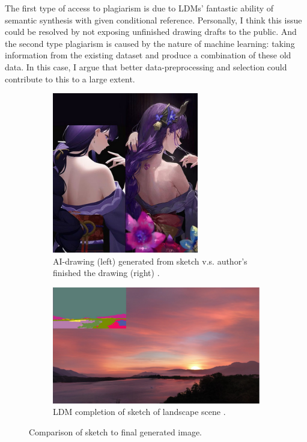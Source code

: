The first type of access to plagiarism is due to LDMs' fantastic ability of semantic 
synthesis with given conditional reference.
Personally, I think this issue could be resolved by not exposing unfinished drawing drafts to the public.
And the second type plagiarism is caused by the nature of machine learning:
taking information from the existing dataset and produce a combination of these old data.
In this case, I argue that better data-preprocessing and selection could contribute to this to a large extent.
\begin{figure}[h]
     \centering
     \begin{subfigure}[b]{0.49\textwidth}
         \centering
         \includegraphics[width=0.7\textwidth]{img/LDM-2.png}
         \caption{
            AI-drawing (left) generated from sketch v.s. 
            author's finished the drawing (right) \cite{Sahbegovic2022anime}.
        }
     \end{subfigure}
     \hfill
     \begin{subfigure}[b]{0.49\textwidth}
         \centering
         \includegraphics[width=\textwidth]{img/LDM-3.png}
         \caption{LDM completion of sketch of landscape scene \cite{Rombach2022High}.}
     \end{subfigure}
     \hfill
     \caption{Comparison of sketch to final generated image.}
\end{figure}
